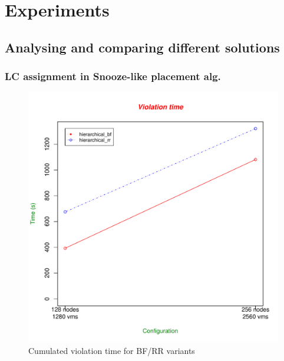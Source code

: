 \section{Experiments}
\label{sec:experiments}
\subsection{Analysing and comparing different solutions}

\subsubsection{LC assignment in Snooze-like placement alg.}
\label{sec:snoozeVariantsEval}

\begin{figure}[ht]
\begin{center}
    \includegraphics[width=.95\linewidth]{figures/violationTime-snooze-RR-BF.pdf}
\caption{Cumulated violation time for BF/RR variants}
\end{center}
\label{fig:snoozeBFRRViolation}
\end{figure}

